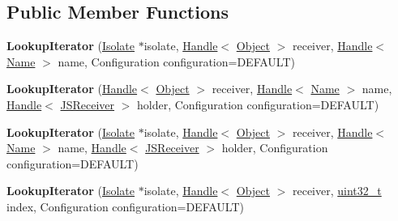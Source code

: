 \subsection*{Public Member Functions}
\begin{DoxyCompactItemize}
\item 
\mbox{\label{classv8_1_1internal_1_1LookupIterator_ad5b694bb52570b3f9c17f1914906de4d}} 
{\bfseries Lookup\+Iterator} (\mbox{\hyperlink{classv8_1_1internal_1_1Isolate}{Isolate}} $\ast$isolate, \mbox{\hyperlink{classv8_1_1internal_1_1Handle}{Handle}}$<$ \mbox{\hyperlink{classv8_1_1internal_1_1Object}{Object}} $>$ receiver, \mbox{\hyperlink{classv8_1_1internal_1_1Handle}{Handle}}$<$ \mbox{\hyperlink{classv8_1_1internal_1_1Name}{Name}} $>$ name, Configuration configuration=D\+E\+F\+A\+U\+LT)
\item 
\mbox{\label{classv8_1_1internal_1_1LookupIterator_aab5fa93f1766b5e3439801ff178d6420}} 
{\bfseries Lookup\+Iterator} (\mbox{\hyperlink{classv8_1_1internal_1_1Handle}{Handle}}$<$ \mbox{\hyperlink{classv8_1_1internal_1_1Object}{Object}} $>$ receiver, \mbox{\hyperlink{classv8_1_1internal_1_1Handle}{Handle}}$<$ \mbox{\hyperlink{classv8_1_1internal_1_1Name}{Name}} $>$ name, \mbox{\hyperlink{classv8_1_1internal_1_1Handle}{Handle}}$<$ \mbox{\hyperlink{classv8_1_1internal_1_1JSReceiver}{J\+S\+Receiver}} $>$ holder, Configuration configuration=D\+E\+F\+A\+U\+LT)
\item 
\mbox{\label{classv8_1_1internal_1_1LookupIterator_a94ca20beb3e9f631946155759e3434d1}} 
{\bfseries Lookup\+Iterator} (\mbox{\hyperlink{classv8_1_1internal_1_1Isolate}{Isolate}} $\ast$isolate, \mbox{\hyperlink{classv8_1_1internal_1_1Handle}{Handle}}$<$ \mbox{\hyperlink{classv8_1_1internal_1_1Object}{Object}} $>$ receiver, \mbox{\hyperlink{classv8_1_1internal_1_1Handle}{Handle}}$<$ \mbox{\hyperlink{classv8_1_1internal_1_1Name}{Name}} $>$ name, \mbox{\hyperlink{classv8_1_1internal_1_1Handle}{Handle}}$<$ \mbox{\hyperlink{classv8_1_1internal_1_1JSReceiver}{J\+S\+Receiver}} $>$ holder, Configuration configuration=D\+E\+F\+A\+U\+LT)
\item 
\mbox{\label{classv8_1_1internal_1_1LookupIterator_a57289058504ed3871c09c7a017dae4d1}} 
{\bfseries Lookup\+Iterator} (\mbox{\hyperlink{classv8_1_1internal_1_1Isolate}{Isolate}} $\ast$isolate, \mbox{\hyperlink{classv8_1_1internal_1_1Handle}{Handle}}$<$ \mbox{\hyperlink{classv8_1_1internal_1_1Object}{Object}} $>$ receiver, \mbox{\hyperlink{classuint32__t}{uint32\+\_\+t}} index, Configuration configuration=D\+E\+F\+A\+U\+LT)

\end{DoxyCompactItemize}
